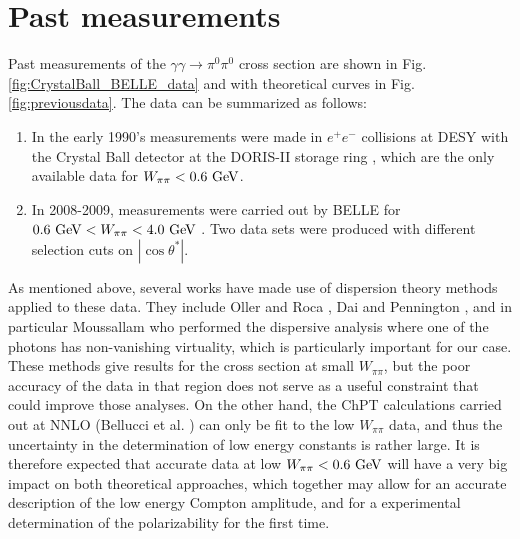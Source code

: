 \section{Past measurements}

Past measurements of the $\gamma\gamma\to \pi^0\pi^0$ cross section
are shown in Fig.\,\ref{fig:CrystalBall_BELLE_data} and with
theoretical curves in Fig.\,\ref{fig:previousdata}. The data can be
summarized as follows:
\begin{enumerate}
    \item 
In the early 1990's measurements were made in $e^+e^-$ collisions at DESY
with the Crystal Ball detector at the DORIS-II storage ring \cite{Marsiske:1990hx}, which are the only
available data for $W_{\pi\pi}<0.6{\rm~ GeV}$. 
\item In 2008-2009, measurements were carried out by BELLE
for $0.6{\rm~ GeV}<W_{\pi\pi}<4.0 {\rm~ GeV}$ \cite{Mori:2007bu,Uehara:2008ep,Uehara:2009cka}. Two data sets were produced with different selection cuts on $|\cos{\theta^*}|$.
\end{enumerate}
As mentioned above, several works have made use of dispersion theory methods
applied to these data. They include Oller and
Roca \cite{Oller:2008kf}, Dai and Pennington \cite{Dai:2016ytz}, and
in particular Moussallam \cite{Moussallam:2013una} who performed the
dispersive analysis where one of the photons has non-vanishing
virtuality, which is particularly important for our case.
These methods give results for the cross
section at small $W_{\pi\pi}$, but the poor accuracy of the data in
that region does not serve as a useful constraint that could improve
those analyses. On the other hand, the ChPT calculations carried out
at NNLO (Bellucci et al. \cite{Bellucci:1994hx,Bellucci:1994eb}) can
only be fit to the low $W_{\pi\pi}$ data, and thus the uncertainty
in the determination of low energy constants is rather large. It is therefore
expected that accurate data at low $W_{\pi\pi}<0.6{\rm~ GeV}$ will
have a very big impact on both theoretical approaches, which together
may allow for an accurate description of the low energy Compton
amplitude, and for a experimental determination of the
polarizability for the first time.

